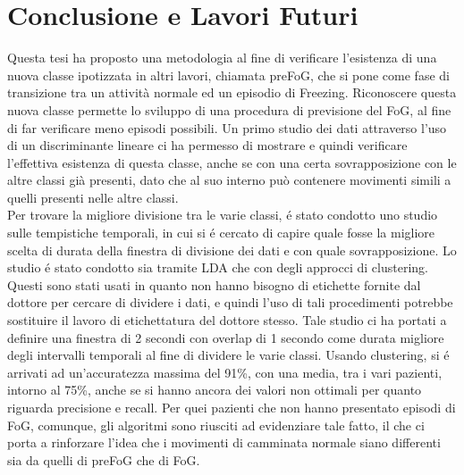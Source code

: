 
\chapter{Conclusione e Lavori Futuri}\label{chap9:Concl}
Questa tesi ha proposto una metodologia al fine di verificare l'esistenza di una nuova classe ipotizzata in altri lavori, chiamata preFoG, che si pone come fase di transizione tra un attività normale ed un episodio di Freezing. Riconoscere questa nuova classe permette lo sviluppo di una procedura di previsione del FoG, al fine di far verificare meno episodi possibili. Un primo studio dei dati attraverso l'uso di un discriminante lineare ci ha permesso di mostrare e quindi verificare l'effettiva esistenza di questa classe, anche se con una certa sovrapposizione con le altre classi già presenti, dato che al suo interno può contenere movimenti simili a quelli presenti nelle altre classi.\\ 
Per trovare la migliore divisione tra le varie classi, é stato condotto uno studio sulle tempistiche temporali, in cui si é cercato di capire quale fosse la migliore scelta di durata della finestra di divisione dei dati e con quale sovrapposizione. Lo studio é stato condotto sia tramite LDA che con degli approcci di clustering. Questi sono stati usati in quanto non hanno bisogno di etichette fornite dal dottore per cercare di dividere i dati, e quindi l'uso di tali procedimenti potrebbe sostituire il lavoro di etichettatura del dottore stesso. Tale studio ci ha portati a definire una finestra di 2 secondi con overlap di 1 secondo come durata migliore degli intervalli temporali al fine di dividere le varie classi. Usando clustering, si é arrivati ad un'accuratezza massima del 91\%, con una media, tra i vari pazienti, intorno al 75\%, anche se si hanno ancora dei valori non ottimali per quanto riguarda precisione e recall. Per quei pazienti che non hanno presentato episodi di FoG, comunque, gli algoritmi sono riusciti ad evidenziare tale fatto, il che ci porta a rinforzare l'idea che i movimenti di camminata normale siano differenti sia da quelli di preFoG che di FoG.\\
